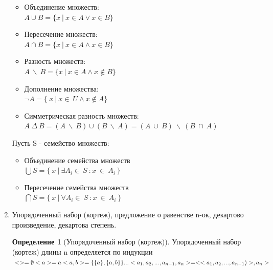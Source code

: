 \documentclass[a4paper]{article}
\theoremstyle{definition}
\newtheorem*{definition*}{Определение}
\begin{document}
\begin{enumerate}
       \begin{itemize}
        \item Объединение множеств:
              \\ $A\cup{B} = \{ x \ | \ x \in{A} \lor x\in{B}\}$
        \item Пересечение множеств:
              \\ $A\cap{B} = \{ x \ | \ x \in{A} \land x\in{B}\}$
        \item Разность множеств:
              \\ $A \ \backslash\  B = \{x\ | \ x\in{A} \land x\notin{B} \}$
        \item Дополнение множества:
              \\ $\neg{A} = \{\ x\ |\ x \in{\ U} \land{x \notin{A}}\} $
        \item Симметрическая разность множеств:
              \\ $A \ \Delta \ B = (A \  \backslash \ B) \cup{(B \ \backslash{\ A})} = (A\ \cup{\ B })\ \backslash \ (B\ \cap{\ A } ) $
       \end{itemize}
       Пусть S - семейство множеств:
       \begin{itemize}
        \item Объединение семейства множеств\\
              $\bigcup{S} = \{\ x\ |\ \exists{A_i} \in{\ S \ }:x\ \in{\ A_i \ }\}$
        \item Пересечение семейства множеств\\
              $\bigcap{S} = \{\ x\ |\ \forall{A_i} \in{\ S\ }: x\ \in{\ A_i \ } \}$
       \end{itemize}
 \item Упорядоченный набор (кортеж), предложение о равенстве n-ок, декартово произведение, декартова степень.
       \begin{definition*}[Упорядоченный набор (кортеж)]
        Упорядоченный набор (кортеж) длины n определяется по индукции
        \begin{math}\\
         <> = \emptyset\\
         <a> = a\\
         <a,b> = \{\{a\},\{a,b\}\}
         \\
         ...
         \\
         <a_1, a_2, ...,a_{n-1} ,a_n> = <<a_1, a_2, ...,a_{n-1})>, a_n>
        \end{math}
       \end{definition*}

\end{enumerate}
\end{document}
